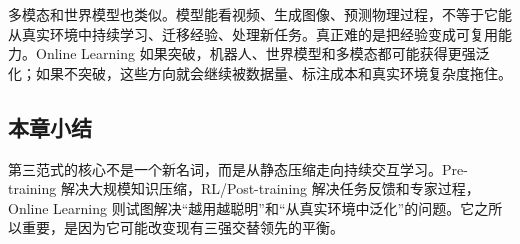 多模态和世界模型也类似。模型能看视频、生成图像、预测物理过程，不等于它能从真实环境中持续学习、迁移经验、处理新任务。真正难的是把经验变成可复用能力。Online Learning 如果突破，机器人、世界模型和多模态都可能获得更强泛化；如果不突破，这些方向就会继续被数据量、标注成本和真实环境复杂度拖住。

\subsection{本章小结}

第三范式的核心不是一个新名词，而是从静态压缩走向持续交互学习。Pre-training 解决大规模知识压缩，RL/Post-training 解决任务反馈和专家过程，Online Learning 则试图解决“越用越聪明”和“从真实环境中泛化”的问题。它之所以重要，是因为它可能改变现有三强交替领先的平衡。

